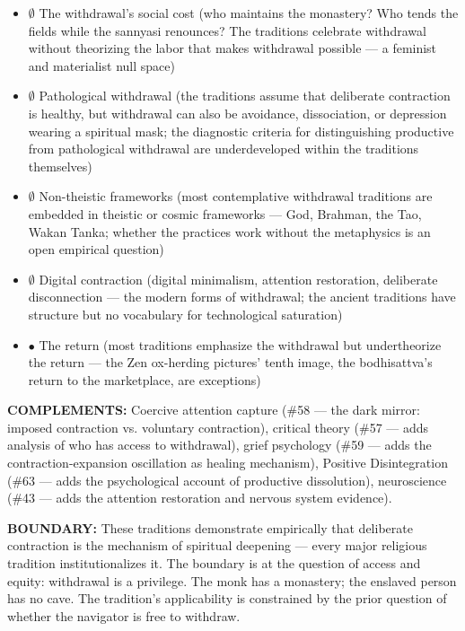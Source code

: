 \begin{itemize}[nosep,leftmargin=*]
  \item $\emptyset$ The withdrawal's social cost (who maintains the monastery? Who tends the fields while the sannyasi renounces? The traditions celebrate withdrawal without theorizing the labor that makes withdrawal possible — a feminist and materialist null space)
  \item $\emptyset$ Pathological withdrawal (the traditions assume that deliberate contraction is healthy, but withdrawal can also be avoidance, dissociation, or depression wearing a spiritual mask; the diagnostic criteria for distinguishing productive from pathological withdrawal are underdeveloped within the traditions themselves)
  \item $\emptyset$ Non-theistic frameworks (most contemplative withdrawal traditions are embedded in theistic or cosmic frameworks — God, Brahman, the Tao, Wakan Tanka; whether the practices work without the metaphysics is an open empirical question)
  \item $\emptyset$ Digital contraction (digital minimalism, attention restoration, deliberate disconnection — the modern forms of withdrawal; the ancient traditions have structure but no vocabulary for technological saturation)
  \item $\bullet$ The return (most traditions emphasize the withdrawal but undertheorize the return — the Zen ox-herding pictures' tenth image, the bodhisattva's return to the marketplace, are exceptions)
\end{itemize}


\textbf{COMPLEMENTS:} Coercive attention capture (\#58 — the dark mirror: imposed contraction vs. voluntary contraction), critical theory (\#57 — adds analysis of who has access to withdrawal), grief psychology (\#59 — adds the contraction-expansion oscillation as healing mechanism), Positive Disintegration (\#63 — adds the psychological account of productive dissolution), neuroscience (\#43 — adds the attention restoration and nervous system evidence).


\textbf{BOUNDARY:} These traditions demonstrate empirically that deliberate contraction is the mechanism of spiritual deepening — every major religious tradition institutionalizes it. The boundary is at the question of access and equity: withdrawal is a privilege. The monk has a monastery; the enslaved person has no cave. The tradition's applicability is constrained by the prior question of whether the navigator is free to withdraw.


